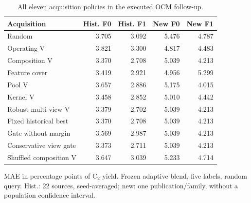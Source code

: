 \begin{table}[htbp]\centering\small
\caption{All eleven acquisition policies in the executed OCM follow-up.}\label{tab:step9all}
\begin{tabular}{lrrrr}\toprule
Acquisition & Hist. F0 & Hist. F1 & New F0 & New F1 \\ \midrule
Random & 3.705 & 3.092 & 5.476 & 4.787 \\
Operating V & 3.821 & 3.300 & 4.817 & 4.483 \\
Composition V & 3.370 & 2.708 & 5.039 & 4.213 \\
Feature cover & 3.419 & 2.921 & 4.956 & 5.299 \\
Pool V & 3.657 & 2.886 & 5.175 & 4.015 \\
Kernel V & 3.458 & 2.852 & 5.010 & 4.442 \\
Robust multi-view V & 3.379 & 2.702 & 5.039 & 4.213 \\
Fixed historical best & 3.370 & 2.708 & 5.039 & 4.213 \\
Gate without margin & 3.569 & 2.987 & 5.039 & 4.213 \\
Conservative view gate & 3.373 & 2.711 & 5.039 & 4.213 \\
Shuffled composition V & 3.647 & 3.039 & 5.233 & 4.714 \\
\bottomrule\end{tabular}
\par\smallskip\footnotesize MAE in percentage points of C$_2$ yield. Frozen adaptive blend, five labels, random query. Hist.: 22 sources, seed-averaged; new: one publication/family, without a population confidence interval.
\end{table}
